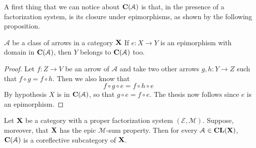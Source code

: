 \documentclass[a4paper,UKenglish,cleveref,pdftex,thm-restate,numberwithinsect]{lipics-v2021}
\newcommand{\cla}{\mathbf{CL}}
\def\C{\textbf {\textup{C}}}
\def\X{\textbf {\textup{X}}}
\begin{document}
A first thing that we can notice about $\C(\mathcal{A})$ is that, in the presence of a factorization system, is its closure under epimorphisms, as shown by the following proposition.

\begin{proposition}\label{prop:ima}
	$\mathcal{A}$ be a class of arrows in a category $\X$ If $e\colon X\to Y$ is an epimorphism with domain in $\C(\mathcal{A})$, then $Y$ belongs to $\C(\mathcal{A})$ too.
\end{proposition}
\begin{proof}
	Let $f\colon Z\to V$ be an arrow of $\mathcal{A}$ and take two other arrows $g,h\colon Y\to Z$ such that $f\circ g=f\circ h$. Then we also know that
	\[f\circ g\circ e= f\circ h\circ e\]
	By hypothesis $X$ is in $\C(\mathcal{A})$, so that $g\circ e=f\circ e$. The thesis now follows since $e$ is an epimorphism.
\end{proof}
\begin{example}
\end{example}


\begin{lemma}\label{lem:cor}
	Let $\X$ be a category with a proper factorization system $(\mathcal{E}, \mathcal{M})$. Suppose, moreover, that $\X$ has the epic $\mathcal{M}$-sum property.  Then for every $\mathcal{A}\in \cla(\X)$, $\C(\mathcal{A})$ is a coreflective subcategory of $\X$.
\end{lemma}
\end{document}
